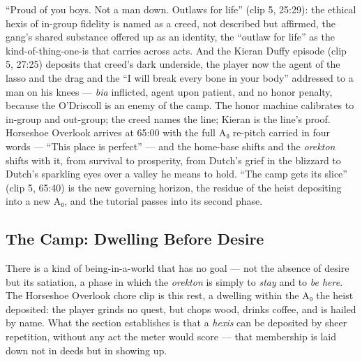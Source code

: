 ``Proud of you boys. Not a man down. Outlaws for life'' (clip 5, 25:29): the ethical hexis of in-group fidelity is named as a creed, not described but affirmed, the gang's shared substance offered up as an identity, the ``outlaw for life'' as the kind-of-thing-one-is that carries across acts. And the Kieran Duffy episode (clip 5, 27:25) deposits that creed's dark underside, the player now the agent of the lasso and the drag and the ``I will break every bone in your body'' addressed to a man on his knees — \textit{bia} inflicted, agent upon patient, and no honor penalty, because the O'Driscoll is an enemy of the camp. The honor machine calibrates to in-group and out-group; the creed names the line; Kieran is the line's proof. Horseshoe Overlook arrives at 65:00 with the full A₀ re-pitch carried in four words — ``This place is perfect'' — and the home-base shifts and the \textit{orekton} shifts with it, from survival to prosperity, from Dutch's grief in the blizzard to Dutch's sparkling eyes over a valley he means to hold. ``The camp gets its slice'' (clip 5, 65:40) is the new governing horizon, the residue of the heist depositing into a new A₀, and the tutorial passes into its second phase.

\bigskip

\subsection*{The Camp: Dwelling Before Desire}

There is a kind of being-in-a-world that has no goal — not the absence of desire but its satiation, a phase in which the \textit{orekton} is simply to \textit{stay} and to \textit{be here}. The Horseshoe Overlook chore clip is this rest, a dwelling within the A₀ the heist deposited: the player grinds no quest, but chops wood, drinks coffee, and is hailed by name. What the section establishes is that a \textit{hexis} can be deposited by sheer repetition, without any act the meter would score — that membership is laid down not in deeds but in showing up.

